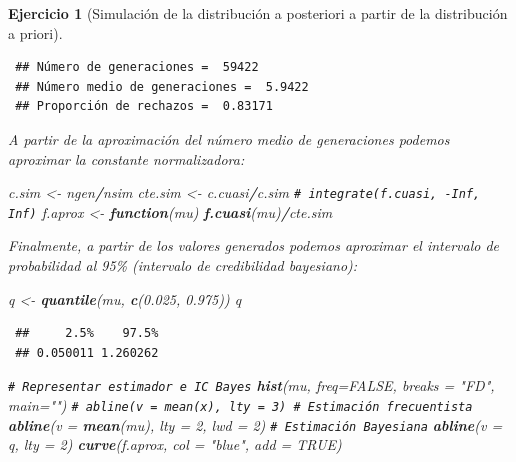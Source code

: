 \documentclass[
  spanish,
  10pt,
]{book}
\newenvironment{Shaded}{\begin{snugshade}}{\end{snugshade}}
\newcommand{\AttributeTok}[1]{\textcolor[rgb]{0.13,0.29,0.53}{#1}}
\newcommand{\CommentTok}[1]{\textcolor[rgb]{0.56,0.35,0.01}{\textit{#1}}}
\newcommand{\ConstantTok}[1]{\textcolor[rgb]{0.56,0.35,0.01}{#1}}
\newcommand{\ControlFlowTok}[1]{\textcolor[rgb]{0.13,0.29,0.53}{\textbf{#1}}}
\newcommand{\DecValTok}[1]{\textcolor[rgb]{0.00,0.00,0.81}{#1}}
\newcommand{\FloatTok}[1]{\textcolor[rgb]{0.00,0.00,0.81}{#1}}
\newcommand{\FunctionTok}[1]{\textcolor[rgb]{0.13,0.29,0.53}{\textbf{#1}}}
\newcommand{\NormalTok}[1]{#1}
\newcommand{\OtherTok}[1]{\textcolor[rgb]{0.56,0.35,0.01}{#1}}
\newcommand{\SpecialCharTok}[1]{\textcolor[rgb]{0.81,0.36,0.00}{\textbf{#1}}}
\newcommand{\StringTok}[1]{\textcolor[rgb]{0.31,0.60,0.02}{#1}}
\theoremstyle{break}
\newtheorem{exercise}{Ejercicio}[chapter]
\theoremstyle{nonumberplain}
\renewcommand{\CommentTok}[1]{\textcolor[rgb]{0.41,0.41,0.41}{\texttt{#1}}}
\begin{document}
\begin{exercise}[Simulación de la distribución a posteriori a partir de la distribución a priori]
\begin{enumerate}
\begin{verbatim}
 ## Número de generaciones =  59422
 ## Número medio de generaciones =  5.9422
 ## Proporción de rechazos =  0.83171
\end{verbatim}

  A partir de la aproximación del número medio de generaciones podemos aproximar la constante normalizadora:

\begin{Shaded}
\begin{Highlighting}[]
\NormalTok{c.sim }\OtherTok{\textless{}{-}}\NormalTok{ ngen}\SpecialCharTok{/}\NormalTok{nsim}
\NormalTok{cte.sim }\OtherTok{\textless{}{-}}\NormalTok{ c.cuasi}\SpecialCharTok{/}\NormalTok{c.sim}
\CommentTok{\# integrate(f.cuasi, {-}Inf, Inf)}
\NormalTok{f.aprox }\OtherTok{\textless{}{-}} \ControlFlowTok{function}\NormalTok{(mu) }\FunctionTok{f.cuasi}\NormalTok{(mu)}\SpecialCharTok{/}\NormalTok{cte.sim}
\end{Highlighting}
\end{Shaded}

  Finalmente, a partir de los valores generados podemos aproximar el intervalo de probabilidad al 95\% (intervalo de credibilidad bayesiano):

\begin{Shaded}
\begin{Highlighting}[]
\NormalTok{q }\OtherTok{\textless{}{-}} \FunctionTok{quantile}\NormalTok{(mu, }\FunctionTok{c}\NormalTok{(}\FloatTok{0.025}\NormalTok{, }\FloatTok{0.975}\NormalTok{))}
\NormalTok{q}
\end{Highlighting}
\end{Shaded}

\begin{verbatim}
 ##     2.5%    97.5% 
 ## 0.050011 1.260262
\end{verbatim}

\begin{Shaded}
\begin{Highlighting}[]
\CommentTok{\# Representar estimador e IC Bayes}
\FunctionTok{hist}\NormalTok{(mu, }\AttributeTok{freq=}\ConstantTok{FALSE}\NormalTok{, }\AttributeTok{breaks =} \StringTok{"FD"}\NormalTok{, }\AttributeTok{main=}\StringTok{""}\NormalTok{)}
\CommentTok{\# abline(v = mean(x), lty = 3) \# Estimación frecuentista}
\FunctionTok{abline}\NormalTok{(}\AttributeTok{v =} \FunctionTok{mean}\NormalTok{(mu), }\AttributeTok{lty =} \DecValTok{2}\NormalTok{, }\AttributeTok{lwd =} \DecValTok{2}\NormalTok{)  }\CommentTok{\# Estimación Bayesiana}
\FunctionTok{abline}\NormalTok{(}\AttributeTok{v =}\NormalTok{ q, }\AttributeTok{lty =} \DecValTok{2}\NormalTok{)}
\FunctionTok{curve}\NormalTok{(f.aprox, }\AttributeTok{col =} \StringTok{"blue"}\NormalTok{, }\AttributeTok{add =} \ConstantTok{TRUE}\NormalTok{)}
\end{Highlighting}
\end{Shaded}


\end{enumerate}
\end{exercise}
\end{document}

